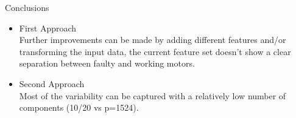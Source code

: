 \documentclass[9pt]{beamer}
\begin{document}
\begin{frame}{Conclusions}
\begin{itemize} 
\item {\large First Approach}\\
Further improvements can be made by adding different features and/or transforming the input data, the current feature set doesn't show a clear separation between faulty and working motors.
\item {\large Second Approach}\\
Most of the variability can be captured with a relatively low number of components (10/20 vs p=1524).
\end{itemize}
\end{frame}
\end{document}

